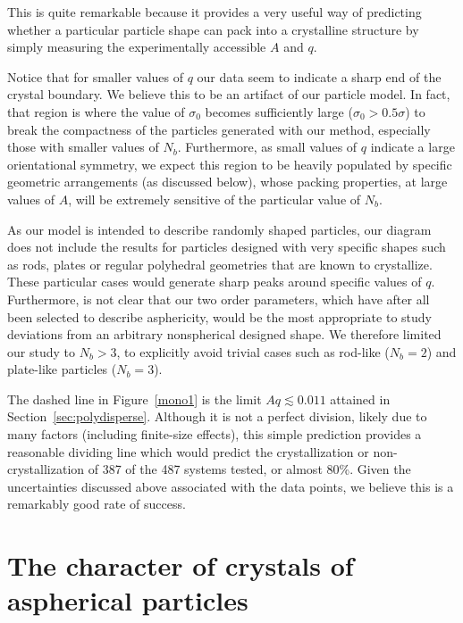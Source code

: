 This is quite remarkable because it provides a very useful way of predicting whether a particular particle shape can pack into a
crystalline structure by simply measuring the experimentally accessible $A$ and $q$. 

Notice that for smaller values of $q$ our data seem to 
indicate a sharp end of the crystal boundary. We believe this to be an artifact of our particle model.
In fact, that region is where the value of $\sigma_0$ becomes sufficiently  large ($\sigma_0>0.5\sigma$)
to break the compactness of the particles generated with our method, especially those with smaller values of $N_b$. 
Furthermore, as small values of $q$ indicate a large orientational symmetry, we expect this
region to be heavily populated by specific  geometric arrangements (as discussed below), whose packing properties, at large values of $A$,
will be extremely sensitive of the particular value of $N_b$. 

As our model is intended to describe randomly shaped particles, 
our diagram does not include the results for particles designed with very specific shapes such as rods,
plates or regular polyhedral geometries that are known to crystallize. 
These particular cases would generate sharp peaks around specific values of $q$. 
Furthermore, is not clear that our two order parameters, which have after all been selected to describe asphericity, 
would be the most appropriate to study deviations from an arbitrary nonspherical designed shape. 
We therefore limited our study to $N_b >3$, to explicitly avoid trivial cases such as rod-like ($N_b=2$) and plate-like particles ($N_b=3$).

The dashed line in Figure~\ref{mono1} is the limit $Aq \lesssim 0.011$ attained in Section~\ref{sec:polydisperse}.
Although it is not a perfect division, likely due to many factors (including finite-size effects), this simple prediction provides a reasonable dividing line which would predict the crystallization or non-crystallization of 387 of the 487 systems tested, or almost 80\%.
Given the uncertainties discussed above associated with the data points,  we believe this is a remarkably good rate of success.

\section{The character of crystals of aspherical particles}

